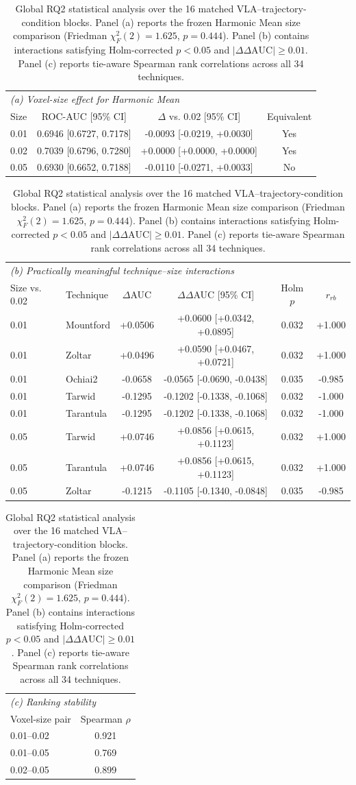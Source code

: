 \begin{table}[t]
\centering
\caption{Global RQ2 statistical analysis over the 16 matched VLA--trajectory-condition blocks. Panel (a) reports the frozen Harmonic Mean size comparison (Friedman $\chi^2_F(2)=1.625$, $p=0.444$). Panel (b) contains interactions satisfying Holm-corrected $p<0.05$ and $|\Delta\Delta\mathrm{AUC}|\geq0.01$. Panel (c) reports tie-aware Spearman rank correlations across all 34 techniques.}
\label{tab:rq2-global-statistics}
{\scriptsize
\setlength{\tabcolsep}{4pt}
\begin{tabular}{lccc}
\toprule
\multicolumn{4}{l}{\textit{(a) Voxel-size effect for Harmonic Mean}} \\
Size & ROC-AUC [95\% CI] & $\Delta$ vs. 0.02 [95\% CI] & Equivalent \\
\midrule
0.01 & 0.6946 [0.6727, 0.7178] & -0.0093 [-0.0219, +0.0030] & Yes \\
0.02 & 0.7039 [0.6796, 0.7280] & +0.0000 [+0.0000, +0.0000] & Yes \\
0.05 & 0.6930 [0.6652, 0.7188] & -0.0110 [-0.0271, +0.0033] & No \\
\bottomrule
\end{tabular}

\vspace{2mm}
\begin{tabular}{llcccc}
\toprule
\multicolumn{6}{l}{\textit{(b) Practically meaningful technique--size interactions}} \\
Size vs. 0.02 & Technique & $\Delta$AUC & $\Delta\Delta$AUC [95\% CI] & Holm $p$ & $r_{rb}$ \\
\midrule
0.01 & Mountford & +0.0506 & +0.0600 [+0.0342, +0.0895] & 0.032 & +1.000 \\
0.01 & Zoltar & +0.0496 & +0.0590 [+0.0467, +0.0721] & 0.032 & +1.000 \\
0.01 & Ochiai2 & -0.0658 & -0.0565 [-0.0690, -0.0438] & 0.035 & -0.985 \\
0.01 & Tarwid & -0.1295 & -0.1202 [-0.1338, -0.1068] & 0.032 & -1.000 \\
0.01 & Tarantula & -0.1295 & -0.1202 [-0.1338, -0.1068] & 0.032 & -1.000 \\
0.05 & Tarwid & +0.0746 & +0.0856 [+0.0615, +0.1123] & 0.032 & +1.000 \\
0.05 & Tarantula & +0.0746 & +0.0856 [+0.0615, +0.1123] & 0.032 & +1.000 \\
0.05 & Zoltar & -0.1215 & -0.1105 [-0.1340, -0.0848] & 0.035 & -0.985 \\
\bottomrule
\end{tabular}

\vspace{2mm}
\begin{tabular}{lc}
\toprule
\multicolumn{2}{l}{\textit{(c) Ranking stability}} \\
Voxel-size pair & Spearman $\rho$ \\
\midrule
0.01--0.02 & 0.921 \\
0.01--0.05 & 0.769 \\
0.02--0.05 & 0.899 \\
\bottomrule
\end{tabular}
}
\end{table}
